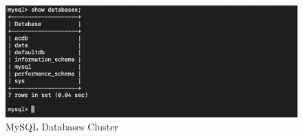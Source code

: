 \bigskip
\bigskip

\begin{figure}[hbt!]
\centering
\includegraphics[width=5in]{../images/mysql-db.png}%
\caption{MySQL Databases Cluster}
\label{fig:mysql databases cluster}
\end{figure}





